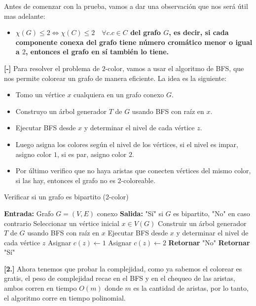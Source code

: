 \documentclass[a4paper]{article}
\newcounter{problem}
\begin{document}
Antes de comenzar con la prueba, vamos a dar una observación que nos será útil mas adelante:
\begin{itemize}
    \item \textbf{$\chi(G) \leq 2 \iff \chi(C) \leq 2 \quad \forall c.c \in C$ del grafo $G$, es decir, si cada componente conexa del grafo tiene número cromático menor o igual a $2$, entonces el grafo en sí también lo tiene.}
\end{itemize}
\textbf{[-]} Para resolver el problema de $2$-color, vamos a usar el algoritmo de BFS, que nos permite colorear un grafo de manera eficiente. La idea es la siguiente:
\begin{itemize}
    \item Tomo un vértice $x$ cualquiera en un grafo conexo $G$.
    \item Construyo un árbol generador $T$ de $G$ usando BFS con raíz en $x$.
    \item Ejecutar BFS desde $x$ y determinar el nivel de cada vértice $z$.
    \item Luego asigna los colores según el nivel de los vértices, si el nivel es impar, asigno color $1$, si es par, asigno color $2$.
    \item Por último verifico que no haya aristas que conecten vértices del mismo color, si las hay, entonces el grafo no es $2$-coloreable.
\end{itemize}
\begin{algorithm}
    \caption{Verificar si un grafo es bipartito (2-color)}
    \begin{algorithmic}[1]
        \STATE \textbf{Entrada:} Grafo $G = (V, E)$ conexo
        \STATE \textbf{Salida:} "Sí" si $G$ es bipartito, "No" en caso contrario
        \STATE Seleccionar un vértice inicial $x \in V(G)$
        \STATE Construir un árbol generador $T$ de $G$ usando BFS con raíz en $x$
        \STATE Ejecutar BFS desde $x$ y determinar el nivel de cada vértice $z$
                \STATE Asignar $c(z) \gets 1$
            \ELSE
                \STATE Asignar $c(z) \gets 2$
            \ENDIF
        \ENDFOR
                \STATE \textbf{Retornar} "No" 
            \ENDIF
        \ENDFOR
        \STATE \textbf{Retornar} "Sí" 
    \end{algorithmic}
\end{algorithm}
\textbf{[2.]} Ahora tenemos que probar la complejidad, como ya sabemos el colorear es gratis, el peso de complejidad recae en el BFS y en el chequeo de las aristas, ambos corren en tiempo $O(m)$ donde $m$ es la cantidad de aristas, por lo tanto, el algoritmo corre en tiempo polinomial.
\end{document}
